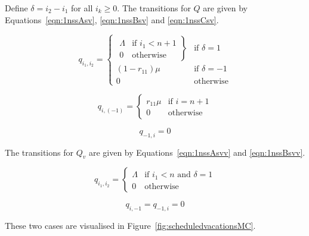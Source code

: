 \documentclass{article}
\begin{document}
Define $\delta = i_2 - i_1$ for all $i_k \geq 0$. The transitions for $Q$ are given by Equations~\ref{eqn:1nssAsv}, \ref{eqn:1nssBsv} and \ref{eqn:1nssCsv}.

\begin{equation}\label{eqn:1nssAsv}
  q_{i_1, i_2} = \left\{
  \begin{array}{rr}
    \left. \begin{array}{rr}
      \Lambda & \text{if } i_1 < n + 1 \\
      0 & \text{otherwise}
    \end{array} \right\} & \text{if } \delta = 1 \\
    (1 - r_{11})\mu & \text{if } \delta = -1 \\
    0 & \text{otherwise}
  \end{array} \right.
\end{equation}

\begin{equation}\label{eqn:1nssBsv}
  q_{i, (-1)} = \left\{
  \begin{array}{rr}
    r_{11}\mu & \text{if } i = n + 1 \\
    0 & \text{otherwise}
  \end{array}
  \right.
\end{equation}

\begin{equation}\label{eqn:1nssCsv}
  q_{-1, i} = 0
\end{equation}

The transitions for $Q_v$ are given by Equations~\ref{eqn:1nssAsvv} and \ref{eqn:1nssBsvv}.

\begin{equation}\label{eqn:1nssAsvv}
  q_{i_1, i_2} = \left\{
  \begin{array}{rr}
      \Lambda & \text{if } i_1 < n \text{ and } \delta = 1 \\
      0 & \text{otherwise}
  \end{array} \right.
\end{equation}

\begin{equation}\label{eqn:1nssBsvv}
  q_{i, -1} = q_{-1, i} = 0
\end{equation}

These two cases are visualised in Figure~\ref{fig:scheduledvacationsMC}.
\end{document}
